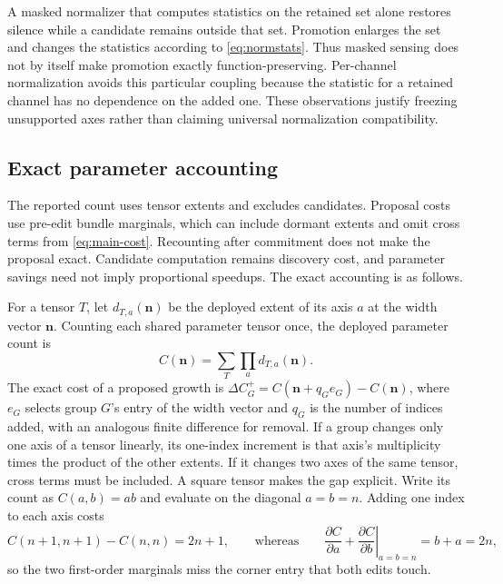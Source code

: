 \documentclass[10pt]{article}
\theoremstyle{paper}
\begin{document}
A masked normalizer that computes statistics on the retained set alone restores silence while a candidate remains outside that set. Promotion enlarges the set and changes the statistics according to \cref{eq:normstats}. Thus masked sensing does not by itself make promotion exactly function-preserving. Per-channel normalization avoids this particular coupling because the statistic for a retained channel has no dependence on the added one. These observations justify freezing unsupported axes rather than claiming universal normalization compatibility.

\subsection{Exact parameter accounting}
\label{app:coupling-accounting}
The reported count uses tensor extents and excludes candidates. Proposal costs use pre-edit bundle marginals, which can include dormant extents and omit cross terms from \cref{eq:main-cost}. Recounting after commitment does not make the proposal exact. Candidate computation remains discovery cost, and parameter savings need not imply proportional speedups. The exact accounting is as follows.

For a tensor $T$, let $d_{T,a}(\bm n)$ be the deployed extent of its axis $a$ at the width vector $\bm n$. Counting each shared parameter tensor once, the deployed parameter count is
\begin{equation}
C(\bm n)=\sum_T\prod_a d_{T,a}(\bm n).
\label{eq:exactcost}
\end{equation}
The exact cost of a proposed growth is $\Delta C_G^+=C(\bm n+q_Ge_G)-C(\bm n)$, where $e_G$ selects group $G$'s entry of the width vector and $q_G$ is the number of indices added, with an analogous finite difference for removal. If a group changes only one axis of a tensor linearly, its one-index increment is that axis's multiplicity times the product of the other extents. If it changes two axes of the same tensor, cross terms must be included. A square tensor makes the gap explicit. Write its count as $C(a,b)=ab$ and evaluate on the
diagonal $a=b=n$. Adding one index to each axis costs
\begin{equation}
C(n+1,n+1)-C(n,n)=2n+1,
\qquad\text{whereas}\qquad
\left.\frac{\partial C}{\partial a}+\frac{\partial C}{\partial b}\right|_{a=b=n}=b+a=2n,
\label{eq:squarecross}
\end{equation}
so the two first-order marginals miss the corner entry that both edits touch.
\end{document}

